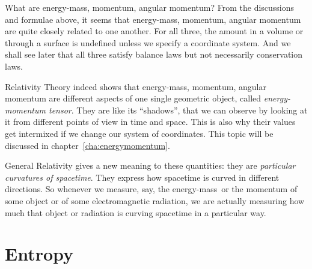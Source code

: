 \documentclass[a4paper,12pt,%
onecolumn,oneside,%
british%
]{memoir}
\newcommand{\mynotew}[1]{{\footnotesize\color{midgrey}\faIcon{tools}\ #1}}
\renewcommand*{\|}[1][]{\nonscript\:#1\vert\nonscript\:\mathopen{}}
\newcommand*{\sect}{\S}%
\newcommand*{\chap}{chapter}%
\newcommand*{\energym}{energy-mass}
\begin{document}
\begin{extra}{{What are \energym, momentum, angular momentum?}}
From the discussions and formulae above, it seems that \energym, momentum, angular momentum are quite closely related to one another. For all three, the amount in a volume or through a surface is undefined unless we specify a coordinate system. And we shall see later that all three satisfy balance laws but not necessarily conservation laws.

  Relativity Theory indeed shows that \energym, momentum, angular momentum are different aspects of one single geometric object, called \emph{energy-momentum tensor}. They are like its \enquote{shadows}, that we can observe by looking at it from different points of view in time and space. This is also why their values get intermixed if we change our system of coordinates. This topic will be discussed in \chap~\ref{cha:energymomentum}.

  General Relativity gives a new meaning to these quantities: they are \emph{particular curvatures of spacetime}. They express how spacetime is curved in different directions. So whenever we measure, say, the \energym\ or the momentum of some object or of some electromagnetic radiation, we are actually measuring how much that object or radiation is curving spacetime in a particular way. %
\end{extra}
%

\section{Entropy}
\label{sec:intro_entropy}
\end{document}
